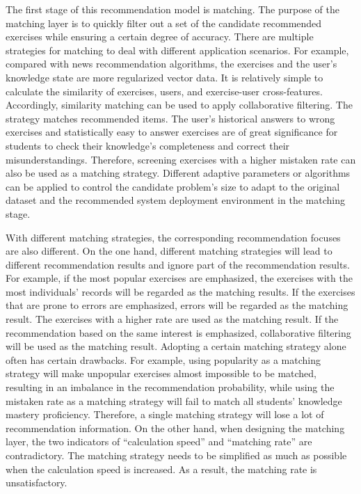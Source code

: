 The first stage of this recommendation model is matching. The purpose of the matching layer is to quickly filter out a set of the candidate recommended exercises while ensuring a certain degree of accuracy. There are multiple strategies for matching to deal with different application scenarios. For example, compared with news recommendation algorithms, the exercises and the user's knowledge state are more regularized vector data. It is relatively simple to calculate the similarity of exercises, users, and exercise-user cross-features. Accordingly, similarity matching can be used to apply collaborative filtering. The strategy matches recommended items. The user's historical answers to wrong exercises and statistically easy to answer exercises are of great significance for students to check their knowledge's completeness and correct their misunderstandings. Therefore, screening exercises with a higher mistaken rate can also be used as a matching strategy. Different adaptive parameters or algorithms can be applied to control the candidate problem's size to adapt to the original dataset and the recommended system deployment environment in the matching stage.

With different matching strategies, the corresponding recommendation focuses are also different. On the one hand, different matching strategies will lead to different recommendation results and ignore part of the recommendation results. For example, if the most popular exercises are emphasized, the exercises with the most individuals' records will be regarded as the matching results. If the exercises that are prone to errors are emphasized, errors will be regarded as the matching result. The exercises with a higher rate are used as the matching result. If the recommendation based on the same interest is emphasized, collaborative filtering will be used as the matching result. Adopting a certain matching strategy alone often has certain drawbacks. For example, using popularity as a matching strategy will make unpopular exercises almost impossible to be matched, resulting in an imbalance in the recommendation probability, while using the mistaken rate as a matching strategy will fail to match all students' knowledge mastery proficiency. Therefore, a single matching strategy will lose a lot of recommendation information. On the other hand, when designing the matching layer, the two indicators of ``calculation speed'' and ``matching rate'' are contradictory. The matching strategy needs to be simplified as much as possible when the calculation speed is increased. As a result, the matching rate is unsatisfactory.

